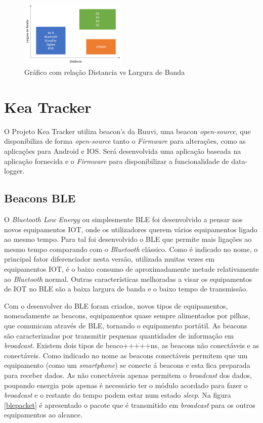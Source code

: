 \begin{figure}[ht]
\centering
\includegraphics[width=0.45\textwidth]{images/lpwan.png}
\caption{Gráfico com relação Distancia vs Largura de Banda\cite{masterthesisLPWAN}}\label{figgraphlpwan}
\end{figure}



\section {Kea Tracker}\label{kea}
O Projeto Kea Tracker utiliza beacon’s da Ruuvi, uma beacon \textit{open-source}\cite{ruuvi}, que disponibiliza de forma \textit{open-source} tanto o \textit{Firmware} para alterações, como as aplicações para Android e IOS. Será desenvolvida uma aplicação baseada na aplicação fornecida e o \textit{Firmware} para disponibilizar a funcionalidade de data-logger.
\subsection{Beacons BLE}
\par
O \textit{Bluetooth Low Energy} ou simplesmente BLE foi desenvolvido a pensar nos novos equipamentos IOT, onde os utilizadores querem vários equipamentos ligado ao mesmo tempo. Para tal foi desenvolvido o BLE que permite mais ligações ao mesmo tempo comparando com o \textit{Bluetooth} clássico.
Como é indicado no nome, o principal fator diferenciador nesta versão, utilizada muitas vezes em equipamentos IOT, é o baixo consumo de aproximadamente metade relativamente ao \textit{Bluetooth} normal. Outras características melhoradas a visar os equipamentos de IOT no BLE são a baixa largura de banda e o baixo tempo de transmissão.

Com o desenvolver do BLE foram criados, novos tipos de equipamentos, nomeadamente as beacons, equipamentos quase sempre alimentados por pilhas, que comunicam através de BLE, tornando o equipamento portátil. As beacons são caracterizadas por transmitir pequenas quantidades de informação em \textit{broadcast}.
Existem dois tipos de beaco+++++ns, as beacons não conectáveis e as conectáveis\cite{blepacket}. Como indicado no nome as beacons conectáveis permitem que um equipamento (como um \textit{smartphone}) se conecte á beacons e esta fica preparada para receber dados. As não conectáveis apenas permitem o \textit{broadcast}  dos dados, poupando energia pois apenas é necessário ter o módulo acordado para fazer o \textit{broadcast} e o restante do tempo podem estar num estado \textit{sleep}. Na figura \ref{blepacket} é apresentado o pacote que é transmitido em \textit{broadcast} para os outros equipamentos ao alcance.

